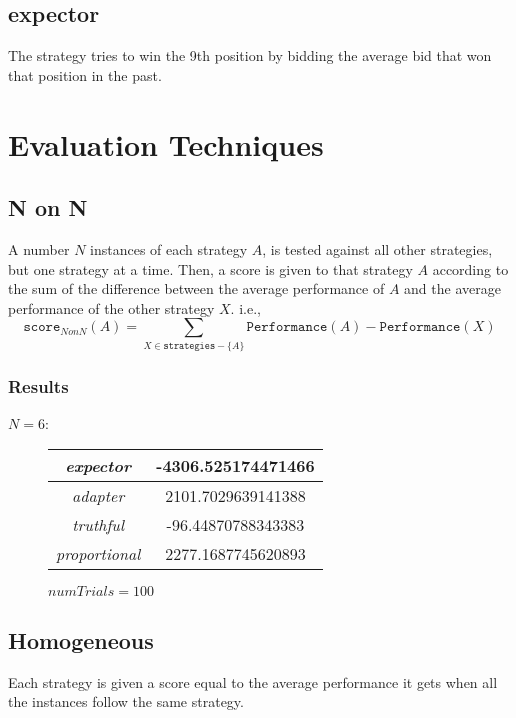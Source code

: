 \documentclass{article}
\newcommand{\expector}{\emph{expector }}
\newcommand{\adapter}{\emph{adapter }}
\newcommand{\truthful}{\emph{truthful }}
\newcommand{\proportional}{\emph{proportional }}
\theoremstyle{remark}
\theoremstyle{remark}
\begin{document}
\subsection{expector}
The strategy tries to win the 9th position by bidding the average bid that won that position in the past.

\section{Evaluation Techniques}
\subsection{N on N}
A number $ N $ instances of each strategy $ A $, is tested against all other strategies, but one strategy at a time. Then, a score is given to that strategy $ A $ according to the sum of the difference between the average performance of $ A $ and the average performance of the other strategy $ X $. i.e.,
\begin{equation}
\texttt{score}_{NonN}(A) = \sum_{X \in \texttt{strategies} - \{A\}}\texttt{Performance}(A) - \texttt{Performance}(X)
\end{equation}


\subsubsection*{Results}
\textbf{$N = 6 $}:
\begin{figure}[H]
	\centering
	\begin{tabular}{||c c||} 
		\hline
		\expector &  -4306.525174471466 \\
		\hline
		\adapter &  2101.7029639141388 \\
		\hline
		\truthful &  -96.44870788343383 \\
		\hline
		\proportional &  2277.1687745620893 \\
		\hline
	\end{tabular}
	\caption{$ numTrials=100$}
\end{figure}

\subsection{Homogeneous}
Each strategy is given a score equal to the average performance it gets when all the instances follow the same strategy.
\end{document}
